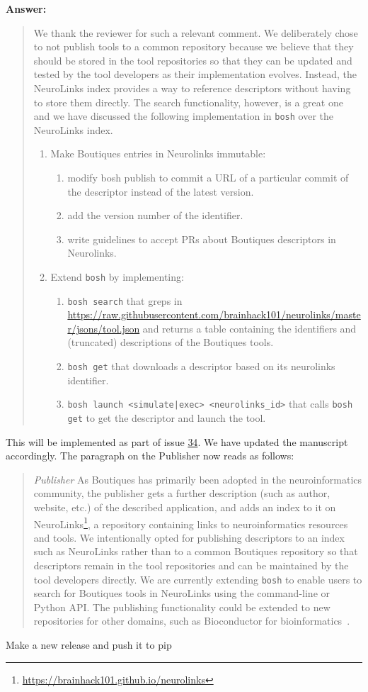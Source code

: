 \documentclass[a4]{article}
\newenvironment{answer}%
{\textbf{Answer:}\begin{small}\begin{quote}}%
{\end{quote}\end{small}}%
\newcommand{\todo}[1]{\color{red}#1\color{black}}
\begin{document}
\begin{answer}
We thank the reviewer for such a relevant comment. We deliberately
chose to not publish tools to a common repository because we believe
that they should be stored in the tool repositories so that they can
be updated and tested by the tool developers as their implementation
evolves. Instead, the NeuroLinks index provides a way to reference
descriptors without having to store them directly. The search
functionality, however, is a great one and we have discussed the following 
implementation in \texttt{bosh} over the NeuroLinks index.
\begin{enumerate}
\item Make Boutiques entries in Neurolinks immutable:
  \begin{enumerate}
  \item modify bosh publish to commit a URL of a particular commit of the descriptor instead of the latest version.
  \item add the version number of the identifier.
  \item write guidelines to accept PRs about Boutiques descriptors in Neurolinks.
  \end{enumerate}
\item Extend \texttt{bosh} by implementing:
  \begin{enumerate}
  \item \texttt{bosh search} that greps in \url{https://raw.githubusercontent.com/brainhack101/neurolinks/master/jsons/tool.json} and returns a table containing the identifiers and (truncated) descriptions of the Boutiques tools. 
  \item \texttt{bosh get} that downloads a descriptor based on its neurolinks identifier.
  \item \texttt{bosh launch <simulate|exec> <neurolinks\_id>}  that calls \texttt{bosh get} to get the descriptor and launch the tool.
  \end{enumerate}
\end{enumerate}
\end{answer}
This will be implemented as part of issue \href{https://github.com/boutiques/boutiques/issues/34}{34}. We have updated the manuscript accordingly. The paragraph on the Publisher now reads as follows:
\begin{quote}
\emph{Publisher} As Boutiques has primarily been adopted in the neuroinformatics
community, the publisher gets a further description (such as author,
website, etc.) of the described application, and adds an index to it
on
NeuroLinks\footnote{\url{https://brainhack101.github.io/neurolinks}},
a repository containing links to neuroinformatics resources and
tools. We intentionally opted for publishing descriptors to an index
such as NeuroLinks rather than to a common Boutiques repository so
that descriptors remain in the tool repositories and can be maintained
by the tool developers directly. We are currently extending
\texttt{bosh} to enable users to search for Boutiques tools in
NeuroLinks using the command-line or Python API. The publishing
functionality could be extended to new repositories for other domains,
such as Bioconductor for
bioinformatics~\cite{gentleman2004bioconductor}.
\end{quote}



\todo{Make a new release and push it to pip}
\end{document}
